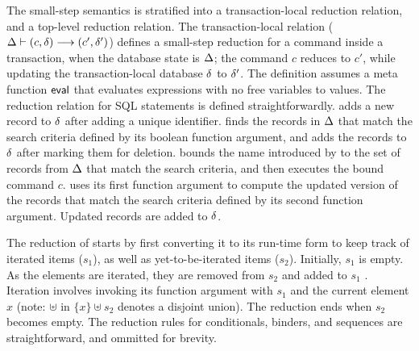 The small-step semantics is stratified into a transaction-local reduction
relation, and a top-level reduction relation. The transaction-local
relation ($\Delta \vdash (c,\delta) \longrightarrow (c',\delta')$) defines a
small-step reduction for a command inside a transaction, when the
database state is $\Delta$; the command $c$ reduces to $c'$, while
updating the transaction-local database $\delta$ to $\delta'$. The
definition assumes a meta function $\textsf{eval}$ that evaluates expressions
with no free variables to values. The reduction relation for SQL
statements is defined straightforwardly.   adds a new record
to $\delta$ after adding a unique identifier.  finds the records in $\Delta$ that match
the search criteria defined by its boolean function argument, and adds
the records to $\delta$ after marking them for deletion. 
bounds the name introduced by  to the set of records from
$\Delta$ that match the search criteria, and then executes the bound
command $c$.  uses its first function argument to compute
the updated version of the records that match the search criteria
defined by its second function argument. Updated records are added to
$\delta$. 

The reduction of  starts by first converting it to its
run-time form to keep track of iterated items ($s_1$),
as well as  yet-to-be-iterated items ($s_2$). Initially, $s_1$ is
empty. As the elements are iterated, they are removed from $s_2$ and
added to $s_1$ . Iteration involves invoking its function argument
with $s_1$ and the current element $x$ (note: $\uplus$ in $\{x\}
\uplus s_2$ denotes a disjoint union). The reduction ends when 
$s_2$ becomes empty. The reduction rules for conditionals, 
binders, and sequences are straightforward, and ommitted for brevity.

